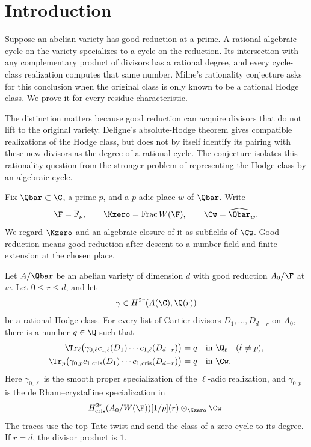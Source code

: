 \section{Introduction}

Suppose an abelian variety has good reduction at a prime. A rational
algebraic cycle on the variety specializes to a cycle on the reduction.
Its intersection with any complementary product of divisors has a rational
degree, and every cycle-class realization computes that same number.
Milne's rationality conjecture asks for this conclusion when the original
class is only known to be a rational Hodge class. We prove it for every
residue characteristic.

The distinction matters because good reduction can acquire divisors that
do not lift to the original variety. Deligne's absolute-Hodge theorem gives
compatible realizations of the Hodge class, but does not by itself identify
its pairing with these new divisors as the degree of a rational cycle.
The conjecture isolates this rationality question from the stronger problem
of representing the Hodge class by an algebraic cycle.

Fix \(\Qbar\subset\C\), a prime \(p\), and a \(p\)-adic place \(w\)
of \(\Qbar\). Write
\[
 \F=\overline{\mathbb F}_p,\qquad
 \Kzero=\operatorname{Frac}W(\F),\qquad
 \Cw=\widehat{\Qbar}_w.
\]
We regard \(\Kzero\) and an algebraic closure of it as subfields of
\(\Cw\). Good reduction means good reduction after descent to a number
field and finite extension at the chosen place.

\begin{theorem}\label{thm:main}
Let \(A/\Qbar\) be an abelian variety of dimension \(d\) with good
reduction \(A_0/\F\) at \(w\). Let \(0\leq r\leq d\), and let
\[
 \gamma\in H^{2r}(A(\C),\Q(r))
\]
be a rational Hodge class. For every list of Cartier divisors
\(D_1,\ldots,D_{d-r}\) on \(A_0\), there is a number \(q\in\Q\)
such that
\begin{align*}
 \Tr_\ell\bigl(\gamma_{0,\ell}
       c_{1,\ell}(D_1)\cdots c_{1,\ell}(D_{d-r})\bigr)&=q
       &&\text{in }\Q_\ell\quad(\ell\ne p),\\
 \Tr_p\bigl(\gamma_{0,p}
       c_{1,\mathrm{cris}}(D_1)\cdots
       c_{1,\mathrm{cris}}(D_{d-r})\bigr)&=q
       &&\text{in }\Cw.
\end{align*}
Here \(\gamma_{0,\ell}\) is the smooth proper specialization of the
\(\ell\)-adic realization, and \(\gamma_{0,p}\) is the
de Rham--crystalline specialization in
\[
 H^{2r}_{\mathrm{cris}}(A_0/W(\F))[1/p](r)
       \otimes_{\Kzero}\Cw.
\]
The traces use the top Tate twist and send the class of a zero-cycle to
its degree. If \(r=d\), the divisor product is \(1\).
\end{theorem}

